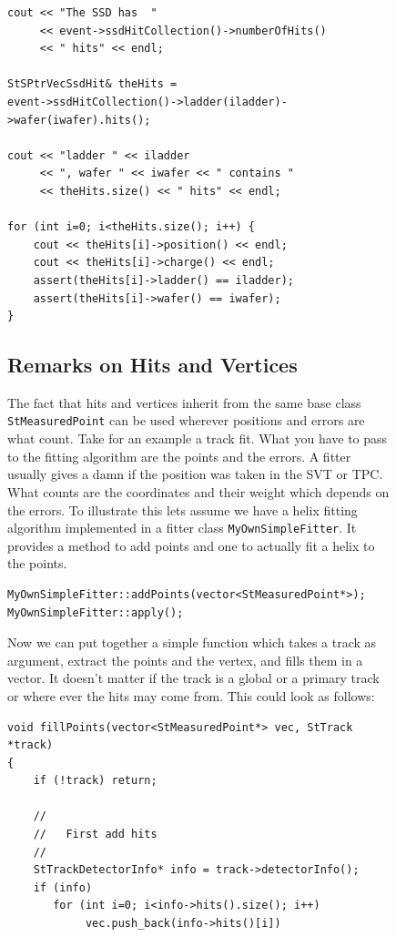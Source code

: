 \documentclass[twoside]{article}
\begin{document}
\begin{figure}[htb]
\begin{center}
\begin{verbatim}
cout << "The SSD has  " 
     << event->ssdHitCollection()->numberOfHits()
     << " hits" << endl;

StSPtrVecSsdHit& theHits =
event->ssdHitCollection()->ladder(iladder)->wafer(iwafer).hits();

cout << "ladder " << iladder
     << ", wafer " << iwafer << " contains "
     << theHits.size() << " hits" << endl;

for (int i=0; i<theHits.size(); i++) {
    cout << theHits[i]->position() << endl;
    cout << theHits[i]->charge() << endl;
    assert(theHits[i]->ladder() == iladder);
    assert(theHits[i]->wafer() == iwafer);
}
\end{verbatim}

\subsection{Remarks on Hits and Vertices}
The fact that hits and vertices inherit from the same base class
\texttt{StMeasuredPoint} can be used wherever positions and errors
are what count. Take for an example a track fit. What you have to pass
to the fitting algorithm are the points and the errors. A fitter usually
gives a damn if the position was taken in the SVT or TPC. What counts
are the coordinates and their weight which depends on the errors.
To illustrate this lets assume we have a helix fitting
algorithm implemented in a fitter class \texttt{MyOwnSimpleFitter}.
It provides a method to add points and one to actually fit a helix to
the points.
\begin{verbatim}
MyOwnSimpleFitter::addPoints(vector<StMeasuredPoint*>);
MyOwnSimpleFitter::apply();
\end{verbatim}
Now we can put together a simple function which takes a track
as argument, extract the points and the vertex, and fills them in a vector.
It doesn't matter if the track is a global or a primary track or where ever
the hits may come from. This could look as follows:
\begin{verbatim}
void fillPoints(vector<StMeasuredPoint*> vec, StTrack *track)
{
    if (!track) return;

    //
    //   First add hits
    //
    StTrackDetectorInfo* info = track->detectorInfo();
    if (info) 
       for (int i=0; i<info->hits().size(); i++)
            vec.push_back(info->hits()[i])


\end{verbatim}
\end{center}
\end{figure}
\end{document}
